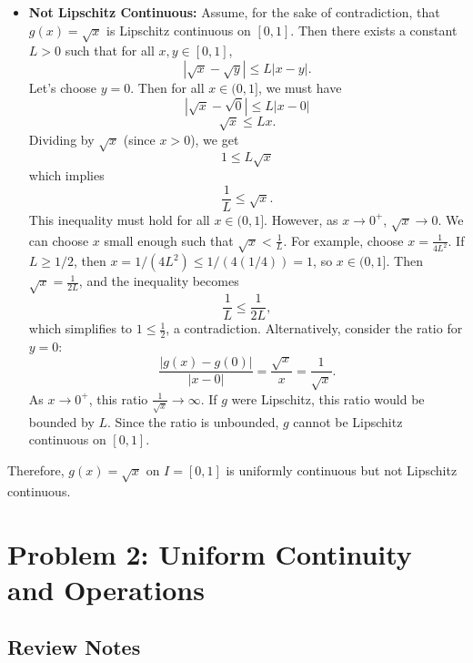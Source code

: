 \documentclass{article}
\begin{document}
\begin{enumerate}
\begin{itemize}
        \item \textbf{Not Lipschitz Continuous:}
            Assume, for the sake of contradiction, that \(g(x) = \sqrt{x}\) is Lipschitz continuous on \([0, 1]\). Then there exists a constant \(L > 0\) such that for all \(x, y \in [0, 1]\),
            \[ |\sqrt{x} - \sqrt{y}| \le L |x-y|. \]
            Let's choose \(y = 0\). Then for all \(x \in (0, 1]\), we must have
            \[ |\sqrt{x} - \sqrt{0}| \le L |x-0| \]
            \[ \sqrt{x} \le L x. \]
            Dividing by \(\sqrt{x}\) (since \(x > 0\)), we get
            \[ 1 \le L \sqrt{x} \]
            which implies
            \[ \frac{1}{L} \le \sqrt{x}. \]
            This inequality must hold for all \(x \in (0, 1]\). However, as \(x \to 0^+\), \(\sqrt{x} \to 0\). We can choose \(x\) small enough such that \(\sqrt{x} < \frac{1}{L}\). For example, choose \(x = \frac{1}{4L^2}\). If \(L \ge 1/2\), then \(x = 1/(4L^2) \le 1/(4(1/4))=1\), so \(x \in (0, 1]\). Then \(\sqrt{x} = \frac{1}{2L}\), and the inequality becomes
            \[ \frac{1}{L} \le \frac{1}{2L}, \]
            which simplifies to \(1 \le \frac{1}{2}\), a contradiction.
            Alternatively, consider the ratio for \(y=0\):
            \[ \frac{|g(x) - g(0)|}{|x-0|} = \frac{\sqrt{x}}{x} = \frac{1}{\sqrt{x}}. \]
            As \(x \to 0^+\), this ratio \(\frac{1}{\sqrt{x}} \to \infty\). If \(g\) were Lipschitz, this ratio would be bounded by \(L\). Since the ratio is unbounded, \(g\) cannot be Lipschitz continuous on \([0, 1]\).
    \end{itemize}
    Therefore, \(g(x) = \sqrt{x}\) on \(I = [0, 1]\) is uniformly continuous but not Lipschitz continuous.
\end{enumerate}

\section*{Problem 2: Uniform Continuity and Operations}

\subsection*{Review Notes}
\end{document}

